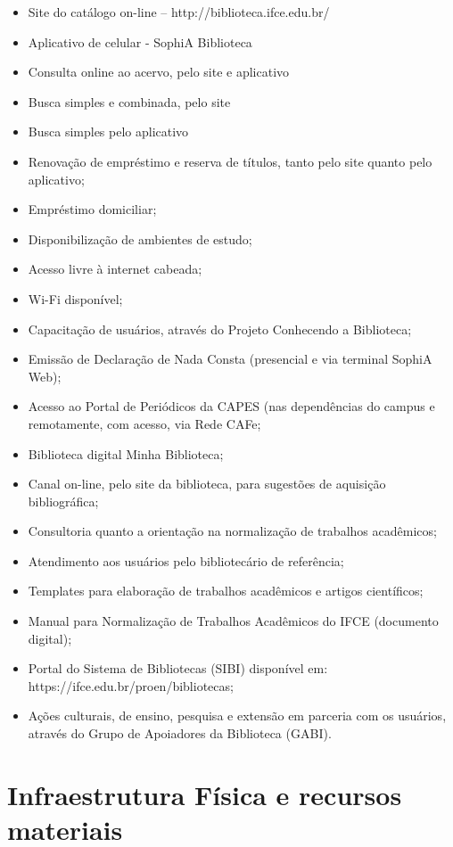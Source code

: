 \begin{itemize}
\item Site do catálogo on-line – http://biblioteca.ifce.edu.br/
\item Aplicativo de celular - SophiA Biblioteca
\item Consulta online ao acervo, pelo site e aplicativo
\item Busca simples e combinada, pelo site
\item Busca simples pelo aplicativo
\item Renovação de empréstimo e reserva de títulos, tanto pelo site quanto pelo aplicativo;
\item Empréstimo domiciliar;
\item Disponibilização de ambientes de estudo;
\item Acesso livre à internet cabeada;
\item Wi-Fi disponível;
\item Capacitação de usuários, através do Projeto Conhecendo a Biblioteca;
\item Emissão de Declaração de Nada Consta (presencial e via terminal SophiA Web);
\item Acesso ao Portal de Periódicos da CAPES (nas dependências do campus e remotamente, com acesso, via Rede CAFe;
\item Biblioteca digital Minha Biblioteca;
\item Canal on-line, pelo site da biblioteca, para sugestões de aquisição bibliográfica;
\item Consultoria quanto a orientação na normalização de trabalhos acadêmicos;
\item Atendimento aos usuários pelo bibliotecário de referência;
\item Templates para elaboração de trabalhos acadêmicos e artigos científicos;
\item Manual para Normalização de Trabalhos Acadêmicos do IFCE (documento digital);
\item Portal do Sistema de Bibliotecas (SIBI) disponível em: https://ifce.edu.br/proen/bibliotecas;
\item Ações culturais, de ensino, pesquisa e extensão em parceria com os usuários, através do Grupo de Apoiadores da Biblioteca (GABI).
\end{itemize}

\section{Infraestrutura Física e recursos materiais}

